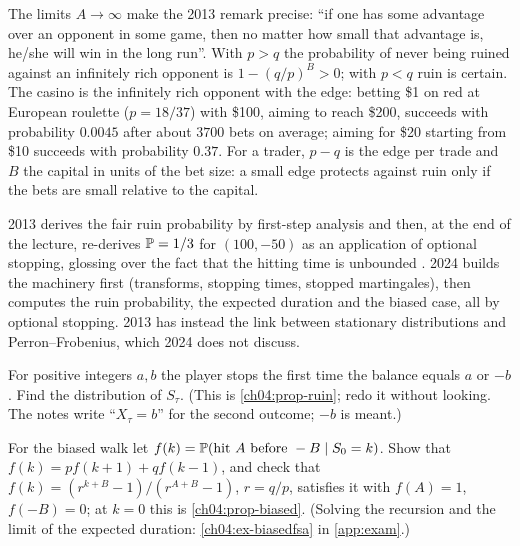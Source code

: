 \begin{paracol}{2}
\begin{finance}
The limits $A\to\infty$ make the 2013 remark precise: ``if one has some advantage over an opponent in some game, then no
matter how small that advantage is, he/she will win in the long run''. With $p>q$ the probability of never being ruined
against an infinitely rich opponent is $1-(q/p)^B>0$; with $p<q$ ruin is certain. The casino is the infinitely rich
opponent with the edge: betting \$1 on red at European roulette ($p=18/37$) with \$100, aiming to reach \$200, succeeds
with probability $0.0045$ after about $3700$ bets on average; aiming for \$20 starting from \$10 succeeds with probability
$0.37$. For a trader, $p-q$ is the edge per trade and $B$ the capital in units of the bet size: a small edge protects
against ruin only if the bets are small relative to the capital.
\end{finance}

\begin{coursenote}
2013 derives the fair ruin probability by first-step analysis and then, at the end of the lecture, re-derives
$\mathbb{P}=1/3$ for $(100,-50)$ as an application of optional stopping, glossing over the fact that the hitting time is
unbounded . 2024 builds the machinery first (transforms, stopping times, stopped martingales), then
computes the ruin probability, the expected duration and the biased case, all by optional stopping. 2013 has instead
the link between stationary distributions and Perron--Frobenius, which 2024 does not discuss.
\end{coursenote}

\begin{exercise}
For positive integers $a,b$ the player stops the first time the balance equals $a$ or $-b$. Find the distribution of
$S_\tau$. (This is \cref{ch04:prop-ruin}; redo it without looking. The notes write ``$X_\tau=b$'' for the second
outcome; $-b$ is meant.)
\end{exercise}

\begin{exercise}\label{ch04:ex-biasedfsa-short}
For the biased walk let $f(k)=\mathbb{P}(\text{hit }A\text{ before }-B\mid S_0=k)$. Show that
$f(k)=pf(k+1)+qf(k-1)$, and check that $f(k)=(r^{k+B}-1)/(r^{A+B}-1)$, $r=q/p$, satisfies it with $f(A)=1$, $f(-B)=0$;
at $k=0$ this is \cref{ch04:prop-biased}. (Solving the recursion and the limit of the expected duration:
\cref{ch04:ex-biasedfsa} in \cref{app:exam}.)
\end{exercise}


\end{paracol}
